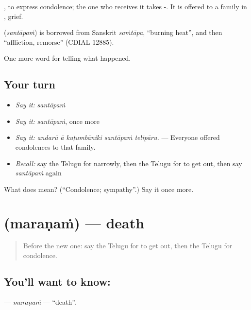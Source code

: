  , to express condolence; the one who receives it takes -. It is offered to a family in , grief.

\begin{cousinweb}
\textbf{} (\emph{santāpaṁ}) is borrowed from Sanskrit \emph{saṁtāpa}, \textquotedblleft{}burning heat\textquotedblright{}, and then \textquotedblleft{}affliction, remorse\textquotedblright{} (CDIAL 12885).
\end{cousinweb}

\begin{grammarlens}[title={What you've built}]
One more word for telling what happened.
\end{grammarlens}

\subsection*{Your turn}
\begin{itemize}
\raggedright
  \item \emph{Say it:} \emph{santāpaṁ}
  \item \emph{Say it:} \emph{santāpaṁ}, once more
  \item \emph{Say it:} \emph{andarū ā kuṭumbāniki santāpaṁ telipāru.} — Everyone offered condolences to that family.
  \item \emph{Recall:} say the Telugu for narrowly, then the Telugu for to get out, then say \emph{santāpaṁ} again
\end{itemize}

\begin{tcolorbox}[breakable,colback=teal!4,colframe=teal!35!black,title={Before you move on}]
What does  mean? (\textquotedblleft{}Condolence; sympathy\textquotedblright{}.) Say it once more.
\end{tcolorbox}
\section[\texorpdfstring{\te{మరణం} (maraṇaṁ)}{మరణం (maraṇaṁ)}]{ (maraṇaṁ) — death}

\label{lesson:TE-C344-maranam}



\begin{quote}
Before the new one: say the Telugu for to get out, then the Telugu for condolence.
\end{quote}

\subsection*{You'll want to know: }
\textbf{} — \emph{maraṇaṁ} — \textquotedblleft{}death\textquotedblright{}.

